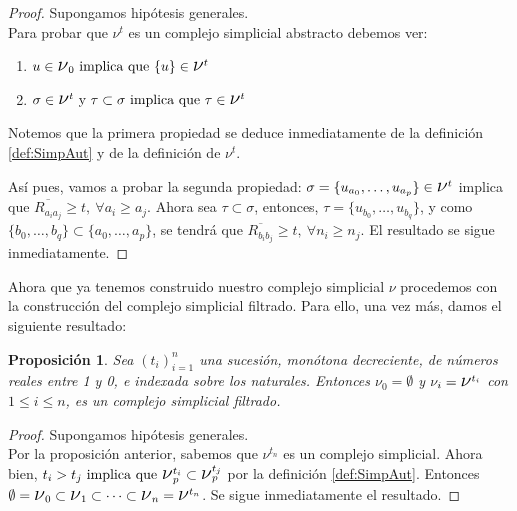 \documentclass[12pt, a4paper, twoside]{book}
\numberwithin{equation}{section}
\theoremstyle{definition}
\theoremstyle{remark}
\theoremstyle{plain}
\newtheorem{prop}{Proposición}
\begin{document}
	\begin{proof}
		Supongamos hipótesis generales. \\
		Para probar que {\Large $\nu$}$^{t}$ es un complejo simplicial 
		abstracto debemos ver: 
		\begin{enumerate}
			\item $u \in \text{{\Large $\nu$}}_{0} \text{ implica 
				que } \{u\} \in \text{{\Large $\nu$}}^{t}$
			\item $ \sigma \in \text{{\Large $\nu$}}^{t} 
				\text{ y } \tau \subset \sigma \text{ implica 
				que } \tau \in \text{{\Large $\nu$}}^{t}$	
		\end{enumerate}
		Notemos que la primera propiedad se deduce inmediatamente de 
		la definición \ref{def:SimpAut} y de la definición de 
		{\Large $\nu$}$^{t}$.

		Así pues, vamos a probar la segunda propiedad:
		$\sigma=\{u_{a_{0}},\dots,u_{a_{p}}\} \in 
		\text{{\Large $\nu$}}^{t}$ 
		 implica que $\overline{R_{a_{i}a_{j}}}\geq t, \  
		\forall a_{i} \geq a_{j}$. 
		Ahora sea $\tau \subset \sigma$, entonces, 
		$\tau = \{u_{b_{0}},\dots,u_{b_{q}}\}$, y como $\{b_{0},\dots,
		b_{q}\} 
		\subset \{a_{0},\dots,a_{p}\}$, se tendrá que 
		$\overline{R_{b_{i}b_{j}}} \geq t,\ \forall n_{i} \geq n_{j}$. 
		El resultado se sigue inmediatamente. 
	\end{proof}

	Ahora que ya tenemos construido nuestro complejo simplicial 
	{\Large $\nu$} procedemos con la construcción del complejo simplicial 
	filtrado. Para ello, una vez más, damos el siguiente resultado:

	\begin{prop}
		Sea $(t_{i})_{i=1}^{n}$ una sucesión, monótona decreciente, 
		de números reales entre 1 y 0, e indexada sobre los naturales. 
		Entonces {\Large $\nu$}$_{0}=\emptyset$ y {\Large $\nu$}$_{i}=
		\text{{\Large $\nu$}}^{t_{i}}$ con $1\leq i \leq n$, es un 
		complejo simplicial filtrado.   
	\end{prop}

	\begin{proof}
		Supongamos hipótesis generales.\\
		Por la proposición anterior, sabemos que 
		{\Large $\nu$}$^{t_{n}}$ es un complejo simplicial. Ahora 
		bien, $t_{i} > t_{j} \text{ implica que } 
		\text{{\Large $\nu$}}_{p}^{t_{i}} \subset 
		\text{{\Large $\nu$}}_{p}^{t_{j}}$ por la definición 
		\ref{def:SimpAut}. Entonces 
		$\emptyset=\text{{\Large $\nu$}}_{0} 
		\subset \text{{\Large $\nu$}}_{1} \subset \cdots \subset 
		\text{{\Large $\nu$}}_{n}=\text{{\Large $\nu$}}^{t_{n}}$. Se 
		sigue inmediatamente el resultado.
	\end{proof}
\end{document}
